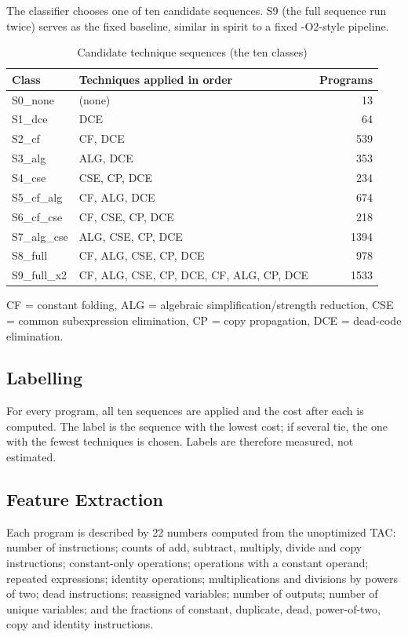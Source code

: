 \documentclass[12pt,a4paper]{article}
\begin{document}
The classifier chooses one of ten candidate sequences. S9 (the full sequence
run twice) serves as the fixed baseline, similar in spirit to a fixed -O2-style
pipeline.

\begin{table}[H]
\centering
\caption{Candidate technique sequences (the ten classes)}
\label{tab:sequences}
\small
\begin{tabularx}{\textwidth}{p{2.6cm}X r}
\toprule
\textbf{Class} & \textbf{Techniques applied in order} & \textbf{Programs}\\
\midrule
S0\_none & (none) & 13\\
S1\_dce & DCE & 64\\
S2\_cf & CF, DCE & 539\\
S3\_alg & ALG, DCE & 353\\
S4\_cse & CSE, CP, DCE & 234\\
S5\_cf\_alg & CF, ALG, DCE & 674\\
S6\_cf\_cse & CF, CSE, CP, DCE & 218\\
S7\_alg\_cse & ALG, CSE, CP, DCE & 1394\\
S8\_full & CF, ALG, CSE, CP, DCE & 978\\
S9\_full\_x2 & CF, ALG, CSE, CP, DCE, CF, ALG, CP, DCE & 1533\\
\bottomrule
\end{tabularx}
\end{table}
\noindent CF = constant folding, ALG = algebraic simplification/strength
reduction, CSE = common subexpression elimination, CP = copy propagation,
DCE = dead-code elimination.

\subsection{Labelling}

For every program, all ten sequences are applied and the cost after each is
computed. The label is the sequence with the lowest cost; if several tie, the
one with the fewest techniques is chosen. Labels are therefore measured, not
estimated.

\subsection{Feature Extraction}

Each program is described by 22 numbers computed from the unoptimized TAC:
number of instructions; counts of add, subtract, multiply, divide and copy
instructions; constant-only operations; operations with a constant operand;
repeated expressions; identity operations; multiplications and divisions by
powers of two; dead instructions; reassigned variables; number of outputs;
number of unique variables; and the fractions of constant, duplicate, dead,
power-of-two, copy and identity instructions.
\end{document}
